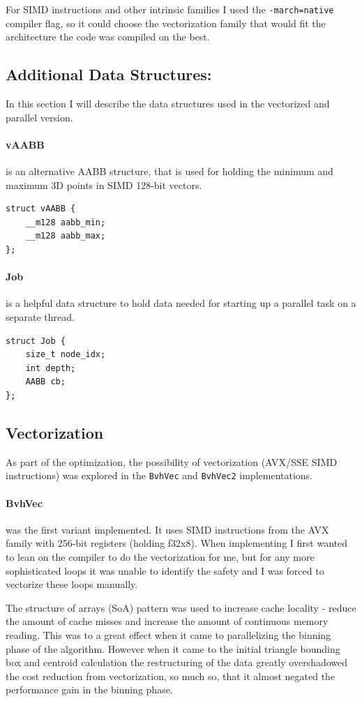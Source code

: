 \documentclass[10pt,a4paper,twocolumn]{article}
\begin{document}
For SIMD instructions and other intrinsic families I used the \texttt{-march=native} compiler flag, so it could choose the vectorization family that would fit the architecture the code was compiled on the best.

\subsection{Additional Data Structures:}
In this section I will describe the data structures used in the vectorized and parallel version.

\paragraph{vAABB} is an alternative AABB structure, that is used for holding the minimum and maximum 3D points in SIMD 128-bit vectors.
\begin{lstlisting}
struct vAABB {
    __m128 aabb_min;
    __m128 aabb_max;
};
\end{lstlisting}

\paragraph{Job} is a helpful data structure to hold data needed for starting up a parallel task on a separate thread.
\begin{lstlisting}
struct Job {
    size_t node_idx;
    int depth;
    AABB cb;
};
\end{lstlisting}

\subsection{Vectorization}

As part of the optimization, the possibility of vectorization (AVX/SSE SIMD instructions) was explored in the \texttt{BvhVec} and \texttt{BvhVec2} implementations.

\paragraph{BvhVec} was the first variant implemented. It uses SIMD instructions from the AVX family with 256-bit registers (holding f32x8). When implementing I first wanted to lean on the compiler to do the vectorization for me, but for any more sophisticated loops it was unable to identify the safety and I was forced to vectorize these loops manually.

The structure of arrays (SoA) pattern was used to increase cache locality - reduce the amount of cache misses and increase the amount of continuous memory reading. This was to a great effect when it came to parallelizing the binning phase of the algorithm. However when it came to the initial triangle bounding box and centroid calculation the restructuring of the data greatly overshadowed the cost reduction from vectorization, so much so, that it almost negated the performance gain in the binning phase.
\end{document}
